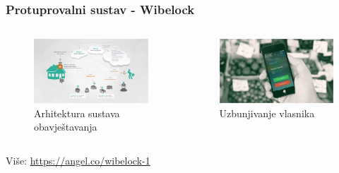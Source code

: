 \documentclass[12pt]{beamer}
\begin{document}
\begin{frame}
	\frametitle{Protuprovalni sustav - Wibelock}
	\begin{columns}[T]
	    \begin{column}{.5\textwidth}
		\begin{figure}[h]
			\begin{minipage}{\textwidth}
				\centering
				\includegraphics[width=\linewidth]{slike/wibelock.jpg}
				\caption{Arhitektura sustava obavještavanja}
			\end{minipage}
		\end{figure}
		
		\end{column}

		\begin{column}{.5\textwidth}
			\begin{figure}[h]
			\begin{minipage}{\textwidth}
				\centering
				\includegraphics[width=\linewidth]{slike/wibelock2.jpg}
				\caption{Uzbunjivanje vlasnika}
			\end{minipage}
		\end{figure}	
		\end{column}
	\end{columns}
	\vfill
	Više: \url{https://angel.co/wibelock-1}
\end{frame}
\end{document}
